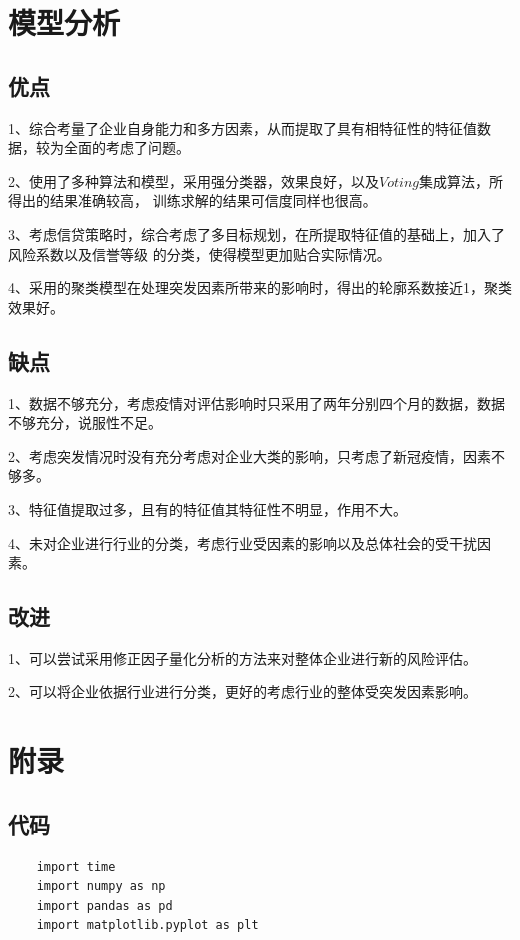 \documentclass[UTF8]{ctexart}
\begin{document}
		
		\section{模型分析}
		\subsection{优点}
		
		1、综合考量了企业自身能力和多方因素，从而提取了具有相特征性的特征值数据，较为全面的考虑了问题。
		
		2、使用了多种算法和模型，采用强分类器，效果良好，以及$Voting$集成算法，所得出的结果准确较高，
		训练求解的结果可信度同样也很高。
		
		3、考虑信贷策略时，综合考虑了多目标规划，在所提取特征值的基础上，加入了风险系数以及信誉等级
		的分类，使得模型更加贴合实际情况。
		
		4、采用的聚类模型在处理突发因素所带来的影响时，得出的轮廓系数接近1，聚类效果好。
		
		\subsection{缺点}
		1、数据不够充分，考虑疫情对评估影响时只采用了两年分别四个月的数据，数据不够充分，说服性不足。
		
		2、考虑突发情况时没有充分考虑对企业大类的影响，只考虑了新冠疫情，因素不够多。
		
		3、特征值提取过多，且有的特征值其特征性不明显，作用不大。
		
		4、未对企业进行行业的分类，考虑行业受因素的影响以及总体社会的受干扰因素。
		
		\subsection{改进}
		1、可以尝试采用修正因子量化分析的方法来对整体企业进行新的风险评估。
		
		2、可以将企业依据行业进行分类，更好的考虑行业的整体受突发因素影响。


\clearpage

\clearpage

\section{附录}
\subsection{代码}

\lstset{language=python}
\begin{lstlisting}
	import time
	import numpy as np
	import pandas as pd
	import matplotlib.pyplot as plt

		
\end{lstlisting}
\end{document}
